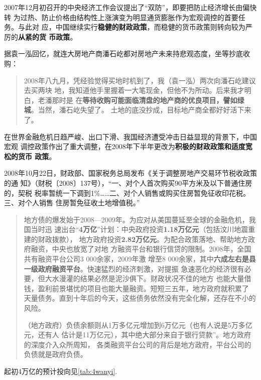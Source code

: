 2007年12月初召开的中央经济工作会议提出了“双防”，即要把防止经济增长由偏快转
为过热、防止价格由结构性上涨演变为明显通货膨胀作为宏观调控的首要任务。与此对
应，中国继续实行\textbf{稳健的财政政策}，而稳健的货币政策则转向较为严厉的\textbf{从紧的货
  币政策}。

据袁一泓回忆，就连大房地产商潘石屹都对房地产未来持悲观态度，坐等抄底收购：
\begin{quotation}
  2008年八九月，凭经验觉得买地时机到了，我（袁一泓）两次向潘石屹建议去买两块
  地，我知道他手里握着一大笔现金，但他不为所动。后来我才明白，老潘那时是
  在\textbf{等待收购可能面临清盘的地产商的优良项目，譬如绿城}。当然，潘石屹失望了。
  土地的底没抄成，目标地产商全都好好活下来了。\cite{2011feiteng}
\end{quotation}

在世界金融危机日趋严峻、出口下滑、我国经济遭受冲击日益显现的背景下，中国宏观
调控政策作出了重大调整，在2008年下半年更改为\textbf{积极的财政政策和适度宽松的货币
  政策}。

2008年10月22日，财政部、国家税务总局发布《关于调整房地产交易环节税收政策的通
知》（财税〔2008〕137号），“一、对个人首次购买90平方米及以下普通住房的，契税
税率暂统一下调到1\%……二、对个人销售或购买住房暂免征收印花税。三、对个人销售
住房暂免征收土地增值税。”

\begin{quotation}
  地方债的爆发始于2008—2009年。为应对从美国蔓延至全球的金融危机，我国当时迅
  速出台“\textbf{4万亿}”计划：中央政府投资\textbf{1.18万亿元}（包括汶川地震重建的财政拨款），
  地方政府投资\textbf{2.82万亿元}。为配合政策落地、帮助地方政府融资，中央也放宽了对地
  方融资平台和银行信贷的限制。2008年，全国共有融资平台公司3 000余家，2009年激
  增至8 000余家，其中\textbf{六成左右是县一级政府融资平台}。快速猛烈的经济刺激，对提振
  急速恶化的经济很有必要，但大水漫灌的结果必然是泥沙俱下。财政状况不佳的地方
  也能大量借钱，盈利前景堪忧的项目也能大量融资。短短三五年，地方政府就积累了
  天量债务。直到十年后的今天，这些债务依然没有完全化解，还存在不小的风险。\cite{zhishenshinei}


  （地方政府）负债余额则从1万多亿元增加到6万亿元（也有人说是5万多亿元，还有人
  估计是11万亿元），其中绝大部分来自于银行贷款”。地方政府的深度介入众所周知，
  各类融资平台公司的背后是地方政府，平台公司的负债就是政府负债。\cite{yangdi}
\end{quotation}

起初4万亿的预计投向见\cref{tab:4wanyi}.

